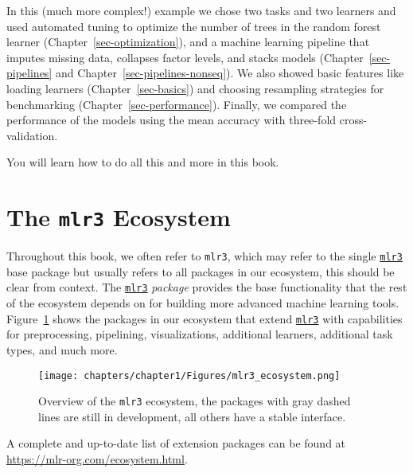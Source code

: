 In this (much more complex!) example we chose two tasks and two learners
and used automated tuning to optimize the number of trees in the random
forest learner (Chapter~\ref{sec-optimization}), and a machine learning
pipeline that imputes missing data, collapses factor levels, and stacks
models (Chapter~\ref{sec-pipelines} and
Chapter~\ref{sec-pipelines-nonseq}). We also showed basic features like
loading learners (Chapter~\ref{sec-basics}) and choosing resampling
strategies for benchmarking (Chapter~\ref{sec-performance}). Finally, we
compared the performance of the models using the mean accuracy with
three-fold cross-validation.

You will learn how to do all this and more in this book.

\hypertarget{the-mlr3-ecosystem}{%
\section{\texorpdfstring{The \texttt{mlr3}
Ecosystem}{The mlr3 Ecosystem}}\label{the-mlr3-ecosystem}}

Throughout this book, we often refer to \texttt{mlr3}, which may refer
to the single
\href{https://mlr3.mlr-org.com}{\texttt{mlr3}} base
package but usually refers to all packages in our ecosystem, this should
be clear from context. The
\href{https://mlr3.mlr-org.com}{\texttt{mlr3}}
\emph{package} provides the base functionality that the rest of the
ecosystem depends on for building more advanced machine learning tools.
Figure~\ref{fig-mlr3verse} shows the packages in our ecosystem that
extend
\href{https://mlr3.mlr-org.com}{\texttt{mlr3}} with
capabilities for preprocessing, pipelining, visualizations, additional
learners, additional task types, and much more.

\begin{figure}

{\centering \texttt{[image: chapters/chapter1/Figures/mlr3\_ecosystem.png]}

}

\caption{\label{fig-mlr3verse}Overview of the \texttt{mlr3} ecosystem,
the packages with gray dashed lines are still in development, all others
have a stable interface.}

\end{figure}

A complete and up-to-date list of extension packages can be found at
\url{https://mlr-org.com/ecosystem.html}.

